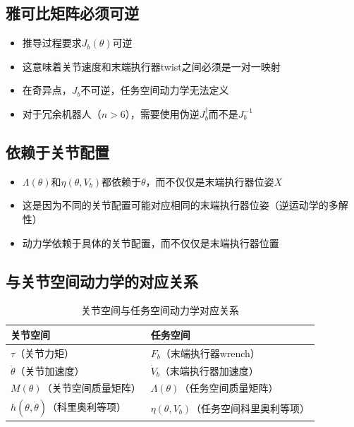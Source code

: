 \documentclass{article}
\begin{document}
\subsection{雅可比矩阵必须可逆}

\begin{itemize}
\item 推导过程要求$J_b(\theta)$可逆
\item 这意味着关节速度和末端执行器twist之间必须是一对一映射
\item 在奇异点，$J_b$不可逆，任务空间动力学无法定义
\item 对于冗余机器人（$n > 6$），需要使用伪逆$J_b^{\dagger}$而不是$J_b^{-1}$
\end{itemize}

\subsection{依赖于关节配置}

\begin{itemize}
\item $\Lambda(\theta)$和$\eta(\theta, V_b)$都依赖于$\theta$，而不仅仅是末端执行器位姿$X$
\item 这是因为不同的关节配置可能对应相同的末端执行器位姿（逆运动学的多解性）
\item 动力学依赖于具体的关节配置，而不仅仅是末端执行器位置
\end{itemize}

\subsection{与关节空间动力学的对应关系}

\begin{table}[h]
\centering
\begin{tabular}{|l|l|}
\hline
\textbf{关节空间} & \textbf{任务空间} \\
\hline
$\tau$（关节力矩） & $F_b$（末端执行器wrench） \\
\hline
$\ddot{\theta}$（关节加速度） & $\dot{V}_b$（末端执行器加速度） \\
\hline
$M(\theta)$（关节空间质量矩阵） & $\Lambda(\theta)$（任务空间质量矩阵） \\
\hline
$h(\theta, \dot{\theta})$（科里奥利等项） & $\eta(\theta, V_b)$（任务空间科里奥利等项） \\
\hline
\end{tabular}
\caption{关节空间与任务空间动力学对应关系}
\end{table}
\end{document}
